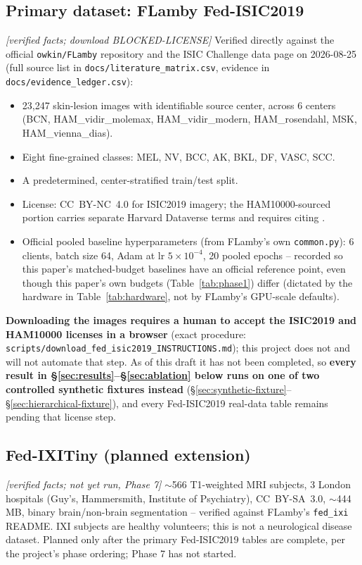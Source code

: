 \documentclass[11pt]{article}
\newcommand{\status}[1]{\textit{[#1]}}
\begin{document}
\subsection{Primary dataset: FLamby Fed-ISIC2019} \status{verified facts;
download BLOCKED-LICENSE}
Verified directly against the official \texttt{owkin/FLamby} repository and
the ISIC Challenge data page on 2026-08-25 (full source list in
\texttt{docs/literature\_matrix.csv}, evidence in
\texttt{docs/evidence\_ledger.csv}):
\begin{itemize}[nosep]
\item 23{,}247 skin-lesion images with identifiable source center, across 6
centers (BCN, HAM\_vidir\_molemax, HAM\_vidir\_modern, HAM\_rosendahl, MSK,
HAM\_vienna\_dias).
\item Eight fine-grained classes: MEL, NV, BCC, AK, BKL, DF, VASC, SCC.
\item A predetermined, center-stratified train/test split.
\item License: CC~BY-NC~4.0 for ISIC2019 imagery; the HAM10000-sourced
portion carries separate Harvard Dataverse terms and requires citing
\citet{tschandl2018ham10000}.
\item Official pooled baseline hyperparameters (from FLamby's own
\texttt{common.py}): 6 clients, batch size 64, Adam at lr $5\times10^{-4}$,
20 pooled epochs -- recorded so this paper's matched-budget baselines have
an official reference point, even though this paper's own budgets
(Table~\ref{tab:phase1}) differ (dictated by the hardware in
Table~\ref{tab:hardware}, not by FLamby's GPU-scale defaults).
\end{itemize}
\textbf{Downloading the images requires a human to accept the ISIC2019 and
HAM10000 licenses in a browser} (exact procedure:
\texttt{scripts/download\_fed\_isic2019\_INSTRUCTIONS.md}); this project
does not and will not automate that step. As of this draft it has not been
completed, so \textbf{every result in \S\ref{sec:results}--\S\ref{sec:ablation}
below runs on one of two controlled synthetic fixtures instead}
(\S\ref{sec:synthetic-fixture}--\S\ref{sec:hierarchical-fixture}), and
every Fed-ISIC2019 real-data table remains pending that license step.

\subsection{Fed-IXITiny (planned extension)} \status{verified facts; not
yet run, Phase 7}
$\sim$566 T1-weighted MRI subjects, 3 London hospitals (Guy's, Hammersmith,
Institute of Psychiatry), CC~BY-SA~3.0, $\sim$444\,MB, binary
brain/non-brain segmentation -- verified against FLamby's \texttt{fed\_ixi}
README. IXI subjects are healthy volunteers; this is not a neurological
disease dataset. Planned only after the primary Fed-ISIC2019 tables are
complete, per the project's phase ordering; Phase 7 has not started.
\end{document}
